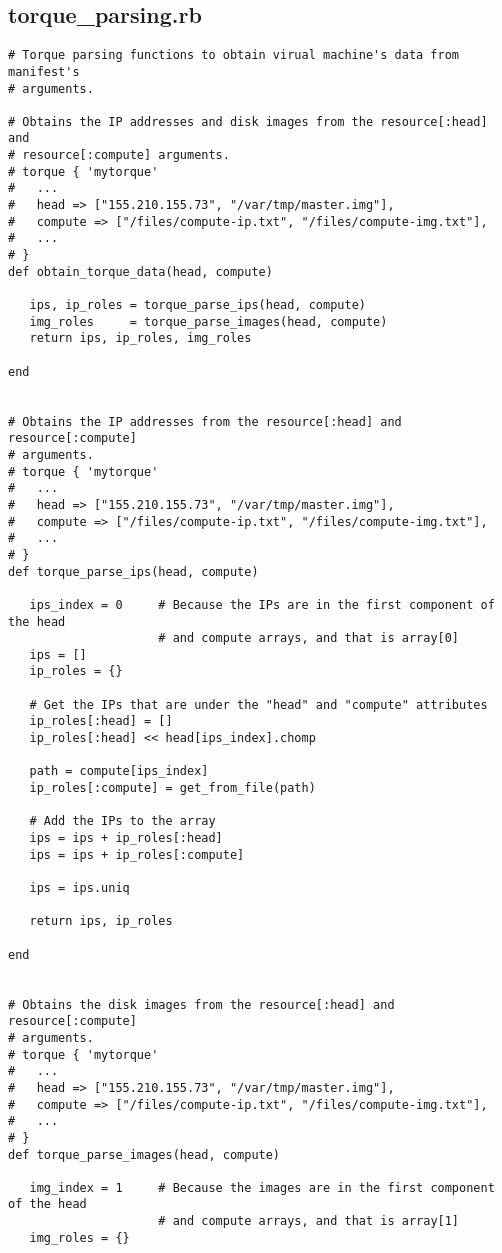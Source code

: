 \subsection{torque\_parsing.rb}


\begin{lstlisting}
# Torque parsing functions to obtain virual machine's data from manifest's
# arguments.

# Obtains the IP addresses and disk images from the resource[:head] and
# resource[:compute] arguments.
# torque { 'mytorque'
#   ...
#   head => ["155.210.155.73", "/var/tmp/master.img"],
#   compute => ["/files/compute-ip.txt", "/files/compute-img.txt"],
#   ...
# }
def obtain_torque_data(head, compute)

   ips, ip_roles = torque_parse_ips(head, compute)
   img_roles     = torque_parse_images(head, compute)
   return ips, ip_roles, img_roles

end


# Obtains the IP addresses from the resource[:head] and resource[:compute]
# arguments.
# torque { 'mytorque'
#   ...
#   head => ["155.210.155.73", "/var/tmp/master.img"],
#   compute => ["/files/compute-ip.txt", "/files/compute-img.txt"],
#   ...
# }
def torque_parse_ips(head, compute)

   ips_index = 0     # Because the IPs are in the first component of the head
                     # and compute arrays, and that is array[0]
   ips = []
   ip_roles = {}
   
   # Get the IPs that are under the "head" and "compute" attributes
   ip_roles[:head] = []
   ip_roles[:head] << head[ips_index].chomp
   
   path = compute[ips_index]
   ip_roles[:compute] = get_from_file(path)
   
   # Add the IPs to the array
   ips = ips + ip_roles[:head]
   ips = ips + ip_roles[:compute]
   
   ips = ips.uniq
   
   return ips, ip_roles
   
end


# Obtains the disk images from the resource[:head] and resource[:compute]
# arguments.
# torque { 'mytorque'
#   ...
#   head => ["155.210.155.73", "/var/tmp/master.img"],
#   compute => ["/files/compute-ip.txt", "/files/compute-img.txt"],
#   ...
# }
def torque_parse_images(head, compute)

   img_index = 1     # Because the images are in the first component of the head
                     # and compute arrays, and that is array[1]
   img_roles = {}


\end{lstlisting}
